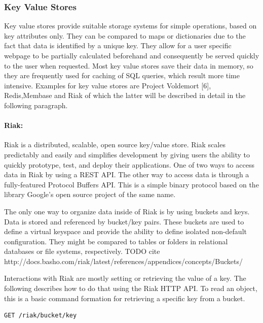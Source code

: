 \subsubsection{Key Value Stores}

Key value stores provide suitable storage systems for simple operations, based on key attributes only. They can be compared to maps or dictionaries due to the fact that data is identified by a unique key. They allow for a user specific webpage to be partially calculated beforehand and consequently be served quickly to the user when requested. Most key value stores save their data in memory, so they are frequently used for caching of SQL queries, which result more time intensive. Examples for key value stores are Project Voldemort [6], Redis,Membase and Riak of which the latter will be described in detail in the following paragraph.

\paragraph{Riak:} Riak is a distributed, scalable, open source key/value store. Riak scales predictably and easily and simplifies development by giving users the ability to quickly prototype, test, and deploy their applications. One of two ways to access data in Riak by using a REST API. The other way to access data is through a fully-featured Protocol Buffers API. This is a simple binary protocol based on the library Google's open source project of the same name.

The only one way to organize data inside of Riak is by using buckets and keys. Data is stored and referenced by bucket/key pairs. These buckets are used to define a virtual keyspace and provide the ability to define isolated non-default configuration. They might be compared to tables or folders in relational databases or file systems, respectively. TODO cite http://docs.basho.com/riak/latest/references/appendices/concepts/Buckets/

Interactions with Riak are mostly setting or retrieving the value of a key. The following describes how to do that using the Riak HTTP API. To read an object, this is a basic command formation for retrieving a specific key from a bucket. 

\begin{code}
\begin{verbatim}
GET /riak/bucket/key
\end{verbatim}
\label{lst:riak_get}
\end{code}

